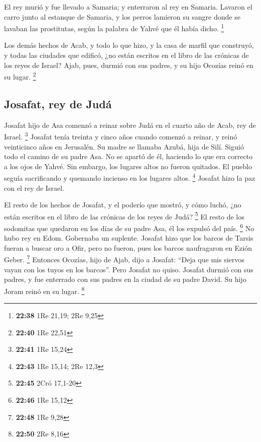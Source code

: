  El rey murió y fue llevado a Samaria; y enterraron al
rey en Samaria.  Lavaron el carro junto al estanque de
Samaria, y los perros lamieron su sangre donde se lavaban las
prostitutas, según la palabra de Yahvé que él había dicho. \footnote{\textbf{22:38}
  1Re 21,19; 2Re 9,25}

 Los demás hechos de Acab, y todo lo que hizo, y la casa
de marfil que construyó, y todas las ciudades que edificó, ¿no están
escritos en el libro de las crónicas de los reyes de Israel?
 Ajab, pues, durmió con sus padres, y su hijo Ocozías
reinó en su lugar. \footnote{\textbf{22:40} 1Re 22,51}

\hypertarget{josafat-rey-de-juduxe1}{%
\subsection{Josafat, rey de Judá}\label{josafat-rey-de-juduxe1}}

 Josafat hijo de Asa comenzó a reinar sobre Judá en el
cuarto año de Acab, rey de Israel. \footnote{\textbf{22:41} 1Re 15,24}
 Josafat tenía treinta y cinco años cuando comenzó a
reinar, y reinó veinticinco años en Jerusalén. Su madre se llamaba
Azubá, hija de Silí.  Siguió todo el camino de su padre
Asa. No se apartó de él, haciendo lo que era correcto a los ojos de
Yahvé. Sin embargo, los lugares altos no fueron quitados. El pueblo
seguía sacrificando y quemando incienso en los lugares altos.
\footnote{\textbf{22:43} 1Re 15,14; 2Re 12,3}  Josafat
hizo la paz con el rey de Israel.

 El resto de los hechos de Josafat, y el poderío que
mostró, y cómo luchó, ¿no están escritos en el libro de las crónicas de
los reyes de Judá? \footnote{\textbf{22:45} 2Cró 17,1-20}
 El resto de los sodomitas que quedaron en los días de su
padre Asa, él los expulsó del país. \footnote{\textbf{22:46} 1Re 15,12}
 No hubo rey en Edom. Gobernaba un suplente.
 Josafat hizo que los barcos de Tarsis fueran a buscar
oro a Ofir, pero no fueron, pues los barcos naufragaron en Ezión Geber.
\footnote{\textbf{22:48} 1Re 9,28}  Entonces Ocozías,
hijo de Ajab, dijo a Josafat: ``Deja que mis siervos vayan con los tuyos
en los barcos''. Pero Josafat no quiso.  Josafat durmió
con sus padres, y fue enterrado con sus padres en la ciudad de su padre
David. Su hijo Joram reinó en su lugar. \footnote{\textbf{22:50} 2Re
  8,16}

